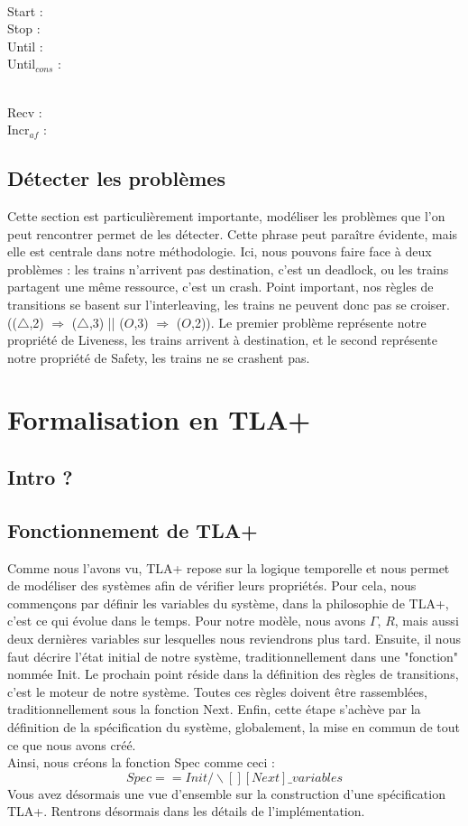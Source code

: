 \documentclass[runningheads]{llncs}
\begin{document}
\noindent
\\Start : 
\\Stop : 
\\Until : 
\\Until$_{cons}$ : 

\noindent
\\Recv : 
\\Incr$_{af}$ :



\subsection{Détecter les problèmes}
Cette section est particulièrement importante, modéliser les problèmes que l'on peut rencontrer permet de les détecter.
Cette phrase peut paraître évidente, mais elle est centrale dans notre méthodologie. Ici, nous pouvons faire face à deux problèmes : 
les trains n'arrivent pas destination, c'est un deadlock, ou les trains partagent une même ressource, c'est un crash. 
Point important, nos règles de transitions se basent sur l'interleaving, les trains ne peuvent donc pas se croiser. (($\triangle$,2) $\Rightarrow$ ($\triangle$,3) || ($O$,3) $\Rightarrow$ ($O$,2)).
Le premier problème représente notre propriété de Liveness, les trains arrivent à destination, et le second représente notre propriété de Safety, les trains ne se crashent pas.

\section{Formalisation en TLA+}
\label{sec:tla-formalisation}

\subsection{Intro ?}

\subsection{Fonctionnement de TLA+}
Comme nous l'avons vu, TLA+ repose sur la logique temporelle et nous permet de modéliser des systèmes afin de vérifier leurs propriétés.
Pour cela, nous commençons par définir les variables du système, dans la philosophie de TLA+, c'est ce qui évolue dans le temps. 
Pour notre modèle, nous avons $\Gamma$, $R$, mais aussi deux dernières variables sur lesquelles nous reviendrons plus tard.
Ensuite, il nous faut décrire l'état initial de notre système, traditionnellement dans une "fonction" nommée Init.
Le prochain point réside dans la définition des règles de transitions, c'est le moteur de notre système. 
Toutes ces règles doivent être rassemblées, traditionnellement sous la fonction Next. 
Enfin, cette étape s'achève par la définition de la spécification du système, globalement, la mise en commun de tout ce que nous avons créé.
\\Ainsi, nous créons la fonction Spec comme ceci : \textit{$$Spec == Init /\backslash [][Next]\_variables$$} %
Vous avez désormais une vue d'ensemble sur la construction d'une spécification TLA+.
Rentrons désormais dans les détails de l'implémentation.
\end{document}
